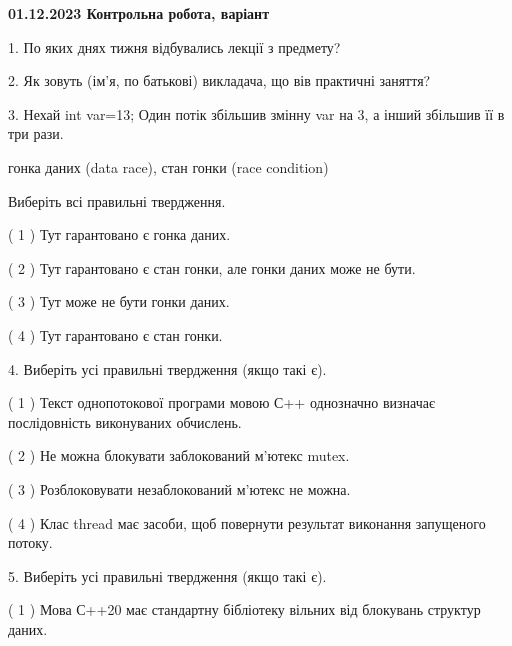 \documentclass[12pt, ukrainian]{article}
\begin{document}
\vspace{4mm}
\newpage
\begin {large}

\textbf{01.12.2023 Контрольна робота, варіант  }\par


{
1. По яких днях тижня відбувались лекції з предмету?



\vspace{5mm}
2. Як зовуть (ім'я, по батькові) викладача, що вів практичні заняття?



\vspace{5mm}
3. Нехай int var=13; Один потік збільшив змінну var на 3, а інший збільшив її в три рази.

гонка даних (data race), стан гонки (race condition)

Виберіть всі правильні твердження.\par
\vspace{2mm}
( 1 ) Тут гарантовано є гонка даних.%

( 2 ) Тут гарантовано є стан гонки, але гонки даних може не бути.%

( 3 ) Тут може не бути гонки даних.%

( 4 ) Тут гарантовано є стан гонки.%


\vspace{5mm}
4. Виберіть усі правильні твердження (якщо такі є).\par
\vspace{2mm}

( 1 ) Текст однопотокової програми мовою С++ однозначно визначає послідовність виконуваних обчислень.%

( 2 ) Не можна блокувати заблокований м’ютекс mutex.%

( 3 ) Розблоковувати незаблокований м’ютекс не можна.%

( 4 ) Клас thread має засоби, щоб повернути результат виконання запущеного потоку.%


\vspace{5mm}
5. Виберіть усі правильні твердження (якщо такі є).\par
\vspace{2mm}

( 1 ) Мова С++20 має стандартну бібліотеку вільних від блокувань структур даних.%

}
\end{large}
\end{document}
